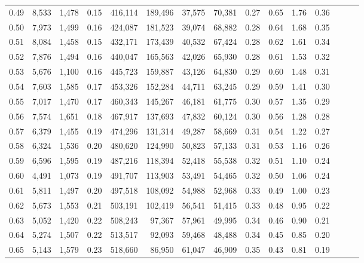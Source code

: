 \begin{tabular}{rrrrrrrrrrrrrrr}
0.49 &   8,533 &  1,478 &  0.15 &  416,114 &  189,496 &   37,575 &   70,381 &  0.27 &  0.65 &  1.76 &      0.36 \\
0.50 &   7,973 &  1,499 &  0.16 &  424,087 &  181,523 &   39,074 &   68,882 &  0.28 &  0.64 &  1.68 &      0.35 \\
0.51 &   8,084 &  1,458 &  0.15 &  432,171 &  173,439 &   40,532 &   67,424 &  0.28 &  0.62 &  1.61 &      0.34 \\
0.52 &   7,876 &  1,494 &  0.16 &  440,047 &  165,563 &   42,026 &   65,930 &  0.28 &  0.61 &  1.53 &      0.32 \\
0.53 &   5,676 &  1,100 &  0.16 &  445,723 &  159,887 &   43,126 &   64,830 &  0.29 &  0.60 &  1.48 &      0.31 \\
0.54 &   7,603 &  1,585 &  0.17 &  453,326 &  152,284 &   44,711 &   63,245 &  0.29 &  0.59 &  1.41 &      0.30 \\
0.55 &   7,017 &  1,470 &  0.17 &  460,343 &  145,267 &   46,181 &   61,775 &  0.30 &  0.57 &  1.35 &      0.29 \\
0.56 &   7,574 &  1,651 &  0.18 &  467,917 &  137,693 &   47,832 &   60,124 &  0.30 &  0.56 &  1.28 &      0.28 \\
0.57 &   6,379 &  1,455 &  0.19 &  474,296 &  131,314 &   49,287 &   58,669 &  0.31 &  0.54 &  1.22 &      0.27 \\
0.58 &   6,324 &  1,536 &  0.20 &  480,620 &  124,990 &   50,823 &   57,133 &  0.31 &  0.53 &  1.16 &      0.26 \\
0.59 &   6,596 &  1,595 &  0.19 &  487,216 &  118,394 &   52,418 &   55,538 &  0.32 &  0.51 &  1.10 &      0.24 \\
0.60 &   4,491 &  1,073 &  0.19 &  491,707 &  113,903 &   53,491 &   54,465 &  0.32 &  0.50 &  1.06 &      0.24 \\
0.61 &   5,811 &  1,497 &  0.20 &  497,518 &  108,092 &   54,988 &   52,968 &  0.33 &  0.49 &  1.00 &      0.23 \\
0.62 &   5,673 &  1,553 &  0.21 &  503,191 &  102,419 &   56,541 &   51,415 &  0.33 &  0.48 &  0.95 &      0.22 \\
0.63 &   5,052 &  1,420 &  0.22 &  508,243 &   97,367 &   57,961 &   49,995 &  0.34 &  0.46 &  0.90 &      0.21 \\
0.64 &   5,274 &  1,507 &  0.22 &  513,517 &   92,093 &   59,468 &   48,488 &  0.34 &  0.45 &  0.85 &      0.20 \\
0.65 &   5,143 &  1,579 &  0.23 &  518,660 &   86,950 &   61,047 &   46,909 &  0.35 &  0.43 &  0.81 &      0.19 \\

\end{tabular}
